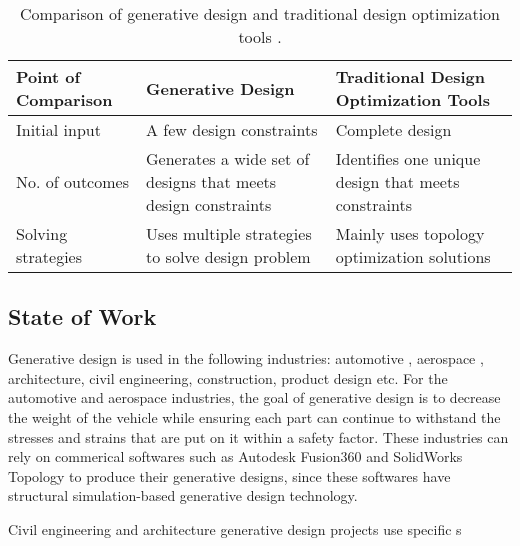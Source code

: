 \documentclass[letterpaper,11pt]{article}
\begin{document}
\begin{table}[!htbp]
        \caption{Comparison of generative design and traditional design optimization tools
        \cite{autodesk_fusion_2020}.}
        \label{tab:compare}
        \centering
        \doublespacing
        \small
        \begin{tabular}{p{3.7cm}|p{5.5cm}p{6cm}}
        \hline
        \textbf{Point of Comparison} & \textbf{Generative Design} & \textbf{Traditional Design Optimization Tools}  \\ \hline
        Initial input & A few design constraints & Complete design \\ 
        No. of outcomes & Generates a wide set of designs that meets design constraints & Identifies one unique design that meets constraints \\   
        Solving strategies & Uses multiple strategies to solve design problem & Mainly uses topology optimization solutions \\ \hline
        \end{tabular}
\end{table}


\subsection{State of Work}
Generative design is used in the following industries: 
automotive \cite{deplazes_autodesk_2019}, aerospace \cite{byrne_evolving_2014},
architecture, civil engineering, construction, product design etc. 
For the automotive and aerospace industries, the goal of generative 
design is to decrease 
the weight of the vehicle while ensuring each part can continue to 
withstand the stresses and strains that are put on it within a 
safety factor. 
These industries can rely on commerical softwares such as 
Autodesk Fusion360 \cite{autodesk_autodesk_2020} and  
SolidWorks Topology \cite{lombard_solidworks_2008}
to produce their generative designs, since these softwares have 
structural simulation-based generative design technology.  

Civil engineering and architecture generative design projects use specific s
\end{document}
